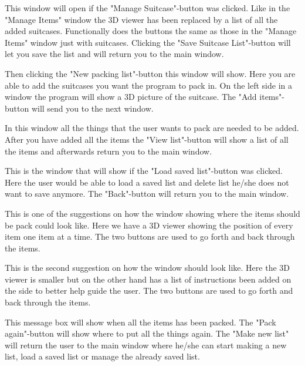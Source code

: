 
This window will open if the "Manage Suitcase"-button was clicked. Like in the "Manage Items" window the 3D viewer has been replaced by a list of all the added suitcases. Functionally does the buttons the same as those in the "Manage Items" window just with suitcases. Clicking the "Save Suitcase List"-button will let you save the list and will return you to the main window.


Then clicking the "New packing list"-button this window will show. Here you are able to add the suitcases you want the program to pack in. On the left side in a window the program will show a 3D picture of the suitcase. The "Add items"-button will send you to the next window.


In this window all the things that the user wants to pack are needed to be added. After you have added all the items the "View list"-button will show a list of all the items and afterwards return you to the main window.


This is the window that will show if the "Load saved list"-button was clicked. Here the user would be able to load a saved list and delete list he/she does not want to save anymore. The "Back"-button will return you to the main window.


This is one of the suggestions on how the window showing where the items should be pack could look like. Here we have a 3D viewer showing the position of every item one item at a time. The two buttons are used to go forth and back through the items.


This is the second suggestion on how the window should look like. Here the 3D viewer is smaller but on the other hand has a list of instructions been added on the side to better help guide the user. The two buttons are used to go forth and back through the items.


This message box will show when all the items has been packed. The "Pack again"-button will show where to put all the things again. The "Make new list" will return the user to the main window where he/she can start making a new list, load a saved list or manage the already saved list. 
